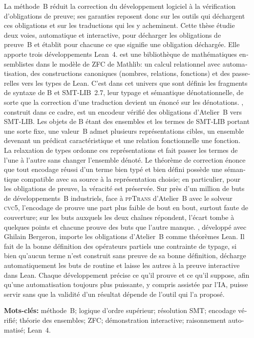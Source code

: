 \begin{otherlanguage}{french}
\medskip
\noindent
La méthode~B réduit la correction du développement logiciel à la vérification
d'obligations de preuve; ses garanties reposent donc sur les outils qui
déchargent ces obligations et sur les traductions qui les y acheminent. Cette
thèse étudie deux voies, automatique et interactive, pour décharger les
obligations de preuve~B et établit pour chacune ce que signifie une
obligation déchargée.
Elle apporte trois développements Lean~4. \zflean{} est une bibliothèque de
mathématiques ensemblistes dans le modèle de ZFC de Mathlib: un calcul
relationnel avec automatisation, des constructions canoniques (nombres, relations,
fonctions) et des passerelles vers les types de Lean. C'est dans cet univers que sont définis les
fragments de syntaxe de B et SMT-LIB~2.7, leur typage et sémantique
dénotationnelle, de sorte que la correction d'une traduction devient un énoncé
sur les dénotations. \beer{}, construit dans ce cadre, est un encodeur vérifié
des obligations d'Atelier~B vers SMT-LIB. Les objets de B étant des ensembles
et les termes de SMT-LIB portant une sorte fixe, une valeur~B admet plusieurs
représentations cibles, un ensemble devenant un prédicat caractéristique et
une relation fonctionnelle une fonction. La relaxation de types ordonne ces
représentations et fait passer les termes de l'une à l'autre sans changer
l'ensemble dénoté. Le théorème de correction énonce que tout encodage
réussi d'un terme bien typé et bien défini possède une sémantique compatible avec sa
source à la représentation choisie; en particulier, pour les obligations de
preuve, la véracité est préservée. Sur près d'un million de buts de
développements~B industriels, face à \textsc{ppTrans} d'Atelier~B avec le solveur \textsc{cvc5},
l'encodage de \beer{} prouve une part plus faible de bout en bout, surtout faute
de couverture; sur les buts auxquels les deux chaînes répondent,
l'écart tombe à quelques points et chacune prouve des buts que l'autre
manque. \barrel{}, développé avec Ghilain Bergeron, importe les obligations
d'Atelier~B comme théorèmes Lean. Il fait de la bonne définition des
opérateurs partiels une contrainte de typage, si bien qu'aucun terme n'est
construit sans preuve de sa bonne définition, décharge automatiquement les
buts de routine et laisse les autres à la preuve interactive dans Lean. Chaque
développement précise ce qu'il prouve et ce qu'il suppose, afin qu'une
automatisation toujours plus puissante, y compris assistée par l'IA, puisse
servir sans que la validité d'un résultat dépende de l'outil qui l'a proposé.

\bigskip
\noindent\textbf{Mots-clés:} méthode~B; logique d'ordre supérieur; résolution
SMT; encodage vérifié; théorie des ensembles; ZFC; démonstration
interactive; raisonnement automatisé; Lean~4.
\end{otherlanguage}
\par\endgroup
